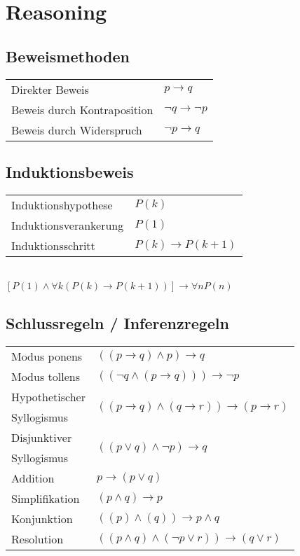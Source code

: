 \section{Reasoning}

\subsection{Beweismethoden}
\begin{tabular}{ll}
    Direkter Beweis & $ p \rightarrow q $ \\
    Beweis durch Kontraposition & $ \neg q \rightarrow \neg p $ \\
    Beweis durch Widerspruch & $ \neg p \rightarrow q $ \\
\end{tabular}

\subsection{Induktionsbeweis}
\begin{tabular}{ll}
    Induktionshypothese & $P(k)$ \\
    Induktionsverankerung & $P(1)$ \\
    Induktionsschritt & $P(k) \to P(k+1)$ \\
\end{tabular} \\

$[P(1) \land \forall k (P(k) \to P(k+1))] \to \forall n P(n)$

\subsection{Schlussregeln / Inferenzregeln}
\begin{tabular}{ll}
    Modus ponens & $((p \to q) \land p) \to q$ \\
    Modus tollens & $((\neg q \land (p \to q))) \to \neg p$ \\
    Hypothetischer & \multirow{2}{*}{$((p \to q) \land (q \to r)) \to (p \to r)$} \\ 
    Syllogismus & \\
    Disjunktiver & \multirow{2}{*}{$((p \lor q) \land \neg p) \to q$} \\
    Syllogismus & \\
    Addition & $p \to (p \lor q)$ \\
    Simplifikation & $(p \land q) \to p$ \\
    Konjunktion & $((p) \land (q)) \to p \land q$ \\
    Resolution & $((p \land q) \land (\neg p \lor r)) \to (q \lor r)$ \\
\end{tabular} \\

